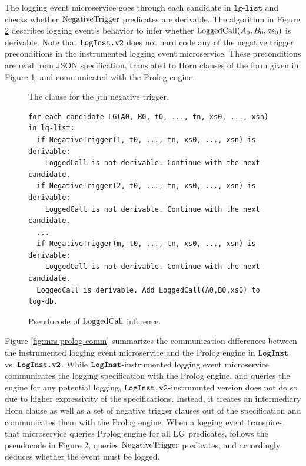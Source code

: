 The logging event microservice goes through each candidate in $\texttt{lg-list}$ and checks whether $\mathrm{NegativeTrigger}$ predicates are derivable. The algorithm in Figure \ref{fig:loggedcall} describes logging event's behavior to infer whether $\mathrm{LoggedCall}(A_0, B_0, \mathit{xs}_0)$ is derivable. Note that $\texttt{LogInst.v2}$ does not hard code any of the negative trigger preconditions in the instrumented logging event microservice. These preconditions are read  from JSON specification, translated to Horn clauses of the form given in Figure \ref{fig:negtrigger}, and communicated with the Prolog engine.

\begin{figure}
\setlength{\fboxsep}{0pt}%
\caption{The clause for the $j$th negative trigger.} 
\label{fig:negtrigger}
\end{figure}



\begin{figure}
\begin{tiny}
\begin{Verbatim}[frame=single]
for each candidate LG(A0, B0, t0, ..., tn, xs0, ..., xsn) in lg-list:
  if NegativeTrigger(1, t0, ..., tn, xs0, ..., xsn) is derivable:
    LoggedCall is not derivable. Continue with the next candidate. 
  if NegativeTrigger(2, t0, ..., tn, xs0, ..., xsn) is derivable:
    LoggedCall is not derivable. Continue with the next candidate. 
  ...
  if NegativeTrigger(m, t0, ..., tn, xs0, ..., xsn) is derivable:
    LoggedCall is not derivable. Continue with the next candidate. 
  LoggedCall is derivable. Add LoggedCall(A0,B0,xs0) to log-db.
\end{Verbatim}
\end{tiny}
\caption{Pseudocode of $\mathrm{LoggedCall}$ inference.}
\label{fig:loggedcall}
\end{figure}


Figure \ref{fig:mrs-prolog-comm} summarizes the communication differences between the instrumented logging event microservice and the Prolog engine in $\texttt{LogInst}$ vs. $\texttt{LogInst.v2}$. While $\texttt{LogInst}$-instrumented logging event microservice communicates the logging specification with the Prolog engine, and queries the engine for any potential logging, $\texttt{LogInst.v2}$-instrumnted version does not do so due to higher expressivity of the specifications. Instead, it creates an intermediary Horn clause as well as a set of negative trigger clauses out of the specification and communicates them with the Prolog engine. When a logging event transpires, that microservice queries Prolog engine for all $\mathrm{LG}$ predicates, follows the pseudocode in Figure \ref{fig:loggedcall}, queries $\mathrm{NegativeTrigger}$ predicates, and accordingly deduces whether the event must be logged.

